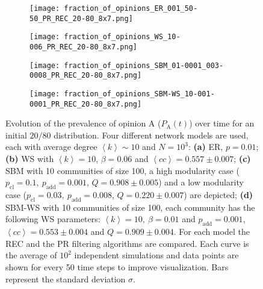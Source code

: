 \documentclass[11 pt , letterpaper , twoside , openright]{book}
\begin{document}
\begin{figure}[H]
  \begin{subfigure}[t]{0.49\textwidth}
    \subcaption{}
  	\texttt{[image: fraction\_of\_opinions\_ER\_001\_50-50\_PR\_REC\_20-80\_8x7.png]}
      \end{subfigure}
  \begin{subfigure}[t]{0.49\textwidth}
    \subcaption{}
  	\texttt{[image: fraction\_of\_opinions\_WS\_10-006\_PR\_REC\_20-80\_8x7.png]}
    \label{ws_20-80_op}
  \end{subfigure}
  \begin{subfigure}[t]{0.49\textwidth}    
    \subcaption{}
    \texttt{[image: fraction\_of\_opinions\_SBM\_01-0001\_003-0008\_PR\_REC\_20-80\_8x7.png]}
  \end{subfigure}
  \begin{subfigure}[t]{0.49\textwidth}
    \subcaption{}
    \texttt{[image: fraction\_of\_opinions\_SBM-WS\_10-001-0001\_PR\_REC\_20-80\_8x7.png]}
    \label{sbm-ws_20-80_op}
  \end{subfigure}
  \captionsetup{format=plain}
  \caption[Evolution of the prevalence of opinion A ($P_\text{A}(t)$) over time for an initial $20/80$ opinion distribution.]{Evolution of the prevalence of opinion A ($P_\text{A}(t)$) over time for an initial $20/80$ distribution. Four different network models are used, each with average degree $\left<k\right> \sim 10$ and $N = 10^3$: \textbf{(a)} ER, $p=0.01$; \textbf{(b)} WS with $\left<k\right> = 10$, $\beta = 0.06$ and $\left<cc\right> = 0.557 \pm 0.007$; \textbf{(c)} SBM with 10 communities of size 100, a high modularity case ($p_{\text{cl}} = 0.1,\ p_{\text{add}} = 0.001$, $Q = 0.908 \pm 0.005$) and a low modularity case ($p_{\text{cl}} = 0.03,\ p_{\text{add}} = 0.008$, $Q = 0.220 \pm 0.007$) are depicted; \textbf{(d)} SBM-WS with 10 communities of size 100, each community has the following WS parameters: $\left<k\right> = 10,\ \beta = 0.01$ and $p_{\text{add}} = 0.001$, $\left<cc\right> = 0.553 \pm 0.004$ and $Q = 0.909 \pm 0.004$. For each model the REC and the PR filtering algorithms are compared. Each curve is the average of $10^2$ independent simulations and data points are shown for every 50 time steps to improve visualization. Bars represent the standard deviation $\sigma$.}
\label{ev_op_20_80}
\end{figure}
\end{document}
